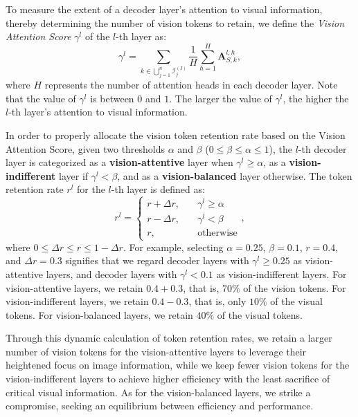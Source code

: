 To measure the extent of a decoder layer's attention to visual information, thereby determining the number of vision tokens to retain, we define the \textit{Vision Attention Score} $\gamma^l$ of the $l$-th layer as:
\begin{equation}
    \gamma^l = \sum_{k \in \bigcup_{j=1}^n\mathcal{I}^{\left(I\right)}_j}\frac{1}{H}\sum_{h=1}^H \mathbf{A}^{l,h}_{S,k},
\end{equation}
where $H$ represents the number of attention heads in each decoder layer. Note that the value of $\gamma^l$ is between $0$ and $1$. The larger the value of $\gamma^l$, the higher the $l$-th layer's attention to visual information.

In order to properly allocate the vision token retention rate based on the Vision Attention Score, given two thresholds $\alpha$ and $\beta$ ($0 \le \beta \le \alpha \le 1$), the $l$-th decoder layer is categorized as a \textbf{vision-attentive} layer when $\gamma^l \ge \alpha$, as a \textbf{vision-indifferent} layer if $\gamma^l < \beta$, and as a \textbf{vision-balanced} layer otherwise. The token retention rate $r^l$ for the $l$-th layer is defined as:
\begin{equation}
    r^l = \begin{cases}r + \Delta r, \quad &\gamma^l \ge \alpha \\ r - \Delta r,\quad &\gamma^l < \beta \\ r,\quad &\text{otherwise}\end{cases},
\end{equation}
where $0 \le \Delta r \le r \le 1 - \Delta r$. For example, selecting $\alpha=0.25$, $\beta=0.1$, $r=0.4$, and $\Delta r=0.3$ signifies that we regard decoder layers with $\gamma^l \ge 0.25$ as vision-attentive layers, and decoder layers with $\gamma^l < 0.1$ as vision-indifferent layers. For vision-attentive layers, we retain $0.4+0.3$, that is, $70\%$ of the vision tokens. For vision-indifferent layers, we retain $0.4-0.3$, that is, only $10\%$ of the visual tokens. For vision-balanced layers, we retain $40\%$ of the visual tokens. 

Through this dynamic calculation of token retention rates, we retain a larger number of vision tokens for the vision-attentive layers to leverage their heightened focus on image information, while we keep fewer vision tokens for the vision-indifferent layers to achieve higher efficiency with the least sacrifice of critical visual information. As for the vision-balanced layers, we strike a compromise, seeking an equilibrium between efficiency and performance.

